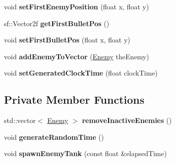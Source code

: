 \begin{DoxyCompactItemize}
void {\bfseries set\+First\+Enemy\+Position} (float x, float y)
\item 
\mbox{\label{class_enemy_manager_a0632e71c86c73e74708d34df6d1fefba}} 
sf\+::\+Vector2f {\bfseries get\+First\+Bullet\+Pos} ()
\item 
\mbox{\label{class_enemy_manager_a217800f39e93529dc7c912857f5a4228}} 
void {\bfseries set\+First\+Bullet\+Pos} (float x, float y)
\item 
\mbox{\label{class_enemy_manager_a73b9e07b84f4c25f88d09744aa373f3b}} 
void {\bfseries add\+Enemy\+To\+Vector} (\hyperlink{class_enemy}{Enemy} the\+Enemy)
\item 
\mbox{\label{class_enemy_manager_a6258b25ccc4866129f9bfe176ee22c1f}} 
void {\bfseries set\+Generated\+Clock\+Time} (float clock\+Time)
\end{DoxyCompactItemize}
\subsection*{Private Member Functions}
\begin{DoxyCompactItemize}
\item 
\mbox{\label{class_enemy_manager_a206ef948ffa7e4d518da91dad493efe6}} 
std\+::vector$<$ \hyperlink{class_enemy}{Enemy} $>$ {\bfseries remove\+Inactive\+Enemies} ()
\item 
\mbox{\label{class_enemy_manager_a4b6f8823d43203930ab98035fe808a55}} 
void {\bfseries generate\+Random\+Time} ()
\item 
\mbox{\label{class_enemy_manager_aecc9136f37db0fb4ce451c3849ecde5d}} 
void {\bfseries spawn\+Enemy\+Tank} (const float \&elapsed\+Time)
\end{DoxyCompactItemize}
